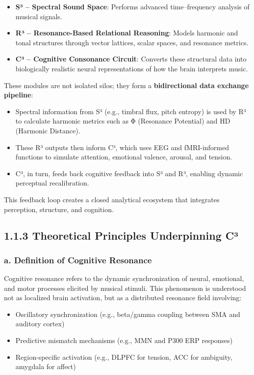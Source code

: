 \begin{itemize}
    \item \textbf{S³ – Spectral Sound Space}: Performs advanced time–frequency analysis of musical signals.
    \item \textbf{R³ – Resonance-Based Relational Reasoning}: Models harmonic and tonal structures through vector lattices, scalar spaces, and resonance metrics.
    \item \textbf{C³ – Cognitive Consonance Circuit}: Converts these structural data into biologically realistic neural representations of how the brain interprets music.
\end{itemize}

These modules are not isolated silos; they form a \textbf{bidirectional data exchange pipeline}:

\begin{itemize}
    \item Spectral information from S³ (e.g., timbral flux, pitch entropy) is used by R³ to calculate harmonic metrics such as Φ (Resonance Potential) and HD (Harmonic Distance).
    \item These R³ outputs then inform C³, which uses EEG and fMRI-informed functions to simulate attention, emotional valence, arousal, and tension.
    \item C³, in turn, feeds back cognitive feedback into S³ and R³, enabling dynamic perceptual recalibration.
\end{itemize}

This feedback loop creates a closed analytical ecosystem that integrates perception, structure, and cognition.

\subsection*{1.1.3 Theoretical Principles Underpinning C³}

\subsubsection*{a. Definition of Cognitive Resonance}

Cognitive resonance refers to the dynamic synchronization of neural, emotional, and motor processes elicited by musical stimuli. This phenomenon is understood not as localized brain activation, but as a distributed resonance field involving:

\begin{itemize}
    \item Oscillatory synchronization (e.g., beta/gamma coupling between SMA and auditory cortex)
    \item Predictive mismatch mechanisms (e.g., MMN and P300 ERP responses)
    \item Region-specific activation (e.g., DLPFC for tension, ACC for ambiguity, amygdala for affect)
\end{itemize}

